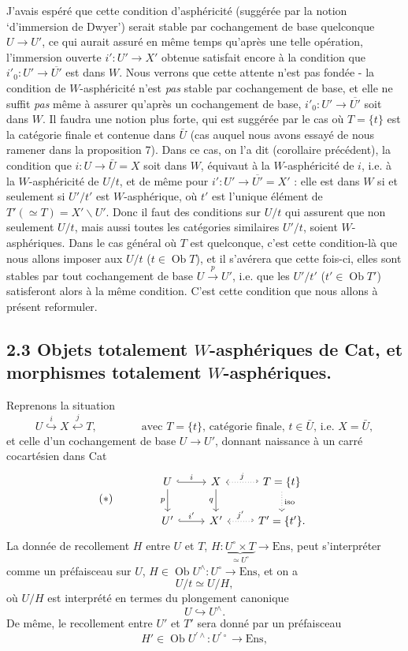 \documentclass[11pt]{article}
\newcommand{\printedpage}[1]{\marginpar{\footnotesize p.~#1}}
\newcommand{\msp}[1]{\marginpar{\footnotesize [#1]}}
\newcommand{\Ob}{\operatorname{Ob}}
\begin{document}
J’avais espéré que cette condition d’asphéricité (suggérée par la notion ‘d’immersion de Dwyer’) serait stable par cochangement de base quelconque $U\longrightarrow U'$, ce qui aurait assuré en même temps qu’après une telle opération, l’immersion ouverte $i':U'\longrightarrow X'$ obtenue satisfait encore à la condition que $i'_0:U'\longrightarrow\overline{U'}$ est dans $W$. Nous verrons que cette attente n’est pas fondée - la condition de $W$-asphéricité n’est \textit{pas} stable par cochangement de base, et elle ne suffit \textit{pas} même à assurer qu’après un cochangement de base, $i'_0:U'\longrightarrow\overline{U'}$ soit
\printedpage{62}
dans $W$. Il faudra une notion plus forte, qui est suggérée par le cas où $T=\{t\}$ est la catégorie finale et contenue dans $\bar U$ (cas auquel nous avons essayé de nous ramener dans la proposition 7). Dans ce cas, on l’a dit (corollaire précédent), la condition que $i:U\longrightarrow\bar U=X$ soit dans $W$, équivaut à la $W$-asphéricité de $i$, i.e. à la $W$-asphéricité de $U/t$, et de même pour $i':U'\longrightarrow\overline{U'}=X'$ : elle est dans $W$ si et seulement si $U'/t'$ est $W$-asphérique, où
\msp{page 87}
$t'$ est l’unique élément de $T'(\simeq T)=X'\backslash U'$. Donc il faut des conditions sur $U/t$ qui assurent que non seulement $U/t$, mais aussi toutes les catégories similaires $U'/t$, soient $W$-asphériques. Dans le cas général où $T$ est quelconque, c’est cette condition-là que nous allons imposer aux $U/t$ ($t\in\Ob T$), et il s’avérera que cette fois-ci, elles sont stables par tout cochangement de base $U\xrightarrow{p}U'$, i.e. que les $U'/t'$ ($t'\in\Ob T'$) satisferont alors à la même condition. C’est cette condition que nous allons à présent reformuler.

\subsection*{2.3 Objets totalement $W$-asphériques de \textnormal{Cat}, et morphismes totalement $W$-asphériques.}

Reprenons la situation
\[
U\overset{i}{\hookrightarrow}X\overset{j}{\hookleftarrow}T,\qquad\qquad\text{avec }T=\{t\}\text{, catégorie finale, }t\in\bar U\text{, i.e. }X=\bar U,
\]
et celle d’un cochangement de base $U\longrightarrow U'$, donnant naissance à un carré cocartésien dans Cat
\[
(*)\qquad\qquad
\begin{tikzcd}
U \arrow[r, hook, "i"] \arrow[d, "p"'] & X \arrow[d, "q"'] & T=\{t\} \arrow[l, hook', dotted, "j"'] \arrow[d, dotted, "\mathrm{iso}"] \\
U' \arrow[r, hook, "i'"] & X' & T'=\{t'\}. \arrow[l, hook', dotted, "j'"']
\end{tikzcd}
\]
La donnée de recollement $H$ entre $U$ et $T$, $H:\underbrace{U^\circ\times T}_{\simeq U^\circ}\longrightarrow\mathrm{Ens}$, peut s’interpréter comme un préfaisceau sur $U$, $H\in\Ob U^\wedge:U^\circ\longrightarrow\mathrm{Ens}$,
\msp{page 88}
et on a
\[
U/t\simeq U/H,
\]
où $U/H$ est interprété en termes du plongement canonique
\[
U\hookrightarrow U^\wedge.
\]
De même, le recollement entre $U'$ et $T'$ sera donné par un préfaisceau
\[
H'\in\Ob U^{\prime\wedge}:U^{\prime\circ}\longrightarrow\mathrm{Ens},
\]
\end{document}
